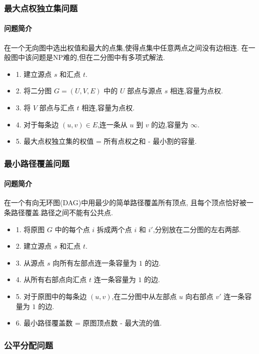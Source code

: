 \subsubsection{最大点权独立集问题}
\paragraph{问题简介}
在一个无向图中选出权值和最大的点集,使得点集中任意两点之间没有边相连.
在一般图中该问题是NP难的,但在二分图中有多项式解法.

\begin{itemize}
    \item 1. 建立源点 $s$ 和汇点 $t$.
    \item 2. 将二分图 $G=(U,V,E)$ 中的 $U$ 部点与源点 $s$ 相连,容量为点权.
    \item 3. 将 $V$ 部点与汇点 $t$ 相连,容量为点权.
    \item 4. 对于每条边 $(u,v) \in E$,连一条从 $u$ 到 $v$ 的边,容量为 $\infty$.
    \item 5. 最大点权独立集的权值 = 所有点权之和 - 最小割的容量.
\end{itemize}

\subsubsection{最小路径覆盖问题}
\paragraph{问题简介}
在一个有向无环图(DAG)中用最少的简单路径覆盖所有顶点,
且每个顶点恰好被一条路径覆盖.路径之间不能有公共点.

\begin{itemize}
    \item 1. 将原图 $G$ 中的每个点 $i$ 拆成两个点 $i$ 和 $i'$,分别放在二分图的左右两部.
    \item 2. 建立源点 $s$ 和汇点 $t$.
    \item 3. 从源点 $s$ 向所有左部点连一条容量为 $1$ 的边.
    \item 4. 从所有右部点向汇点 $t$ 连一条容量为 $1$ 的边.
    \item 5. 对于原图中的每条边 $(u,v)$,在二分图中从左部点 $u$ 向右部点 $v'$ 连一条容量为 $1$ 的边.
    \item 6. 最小路径覆盖数 = 原图顶点数 - 最大流的值.
\end{itemize}

\subsubsection{公平分配问题}
